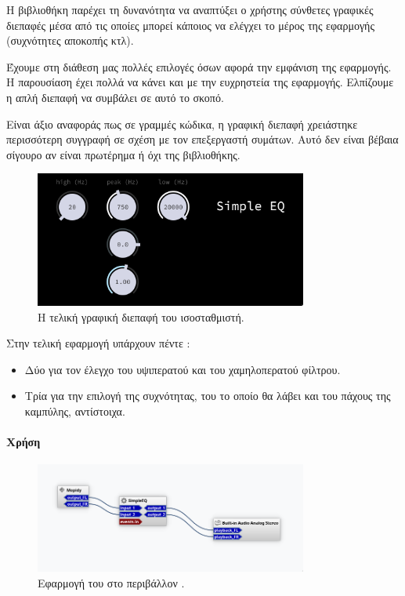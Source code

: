 \documentclass{article}
\begin{document}
Η βιβλιοθήκη  παρέχει τη δυνανότητα να αναπτύξει ο χρήστης 
σύνθετες γραφικές διεπαφές μέσα από τις οποίες μπορεί κάποιος να ελέγχει 
το  μέρος της εφαρμογής (συχνότητες αποκοπής κτλ).

Έχουμε στη διάθεση μας πολλές επιλογές όσων αφορά την εμφάνιση της εφαρμογής. 
Η παρουσίαση έχει πολλά να κάνει και με την ευχρηστεία της εφαρμογής. 
Ελπίζουμε η απλή διεπαφή να συμβάλει σε αυτό το σκοπό. 

Είναι άξιο αναφοράς πως σε γραμμές κώδικα, η γραφική διεπαφή χρειάστηκε 
περισσότερη συγγραφή σε σχέση με τον επεξεργαστή συμάτων. 
Αυτό δεν είναι βέβαια σίγουρο αν είναι πρωτέρημα ή όχι της βιβλιοθήκης.

\begin{figure}[htpb]
    \centering
    \includegraphics[width=0.8\textwidth]{./assets/GUI.png}
    \caption{Η τελική γραφική διεπαφή του ισοσταθμιστή.}
    \label{fig:finalgui}
\end{figure}

Στην τελική εφαρμογή υπάρχουν πέντε :

\begin{itemize}
    \item Δύο για τον έλεγχο του υψιπερατού και του χαμηλοπερατού φίλτρου.
    \item Τρία για την επιλογή της  συχνότητας, του  το οποίο θα λάβει και του πάχους της καμπύλης, αντίστοιχα.
\end{itemize}

\paragraph{Χρήση}

\begin{figure}[htpb]
    \centering
    \includegraphics[width=0.8\textwidth]{./assets/Carla_Basic.png}
    \caption{Εφαρμογή του  στο περιβάλλον .}
    \label{fig:carla_basic}
\end{figure}
\end{document}

